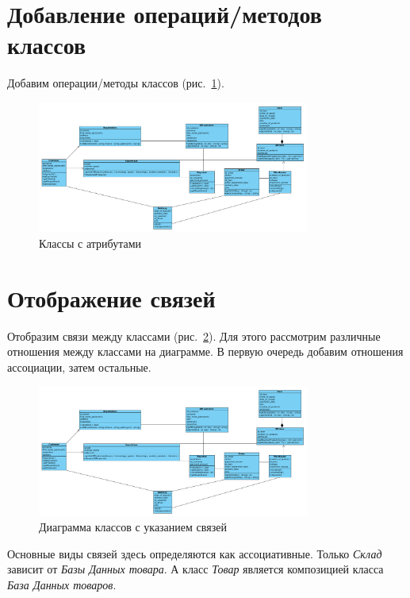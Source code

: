 \section{Добавление операций/методов классов}
Добавим операции/методы классов (рис.~\ref{fig:classes:methods}).

\begin{figure}[h!tp]
	\centering
	\includegraphics[width=0.8\textwidth]{Screenshot from 2023-04-03 14-38-21}
	\caption{Классы с атрибутами}
	\label{fig:classes:methods}
\end{figure}

\section{Отображение связей}
Отобразим связи между классами (рис.~\ref{fig:classes:link}).
Для этого рассмотрим различные отношения между классами на диаграмме.
В первую очередь добавим отношения ассоциации, затем остальные.

\begin{figure}[h!tp]
	\centering
	\includegraphics[width=0.8\textwidth]{Screenshot from 2023-04-03 14-38-21}
	\caption{Диаграмма классов с указанием связей}
	\label{fig:classes:link}
\end{figure}

Основные виды связей здесь определяются как ассоциативные. Только
\textit{Склад} зависит от \textit{Базы Данных товара}.
А класс \textit{Товар} является композицией класса
\textit{База Данных товаров}.


